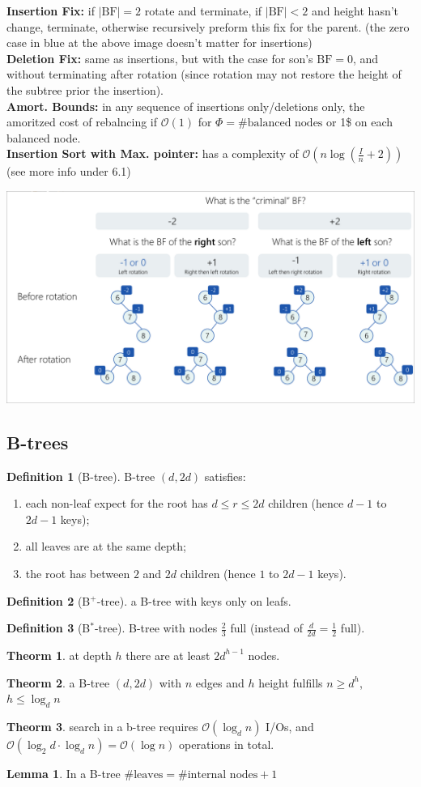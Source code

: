 \documentclass[]{article}
\newcommand\compactsubsection[1]        {\vspace{-10pt}\subsection{#1}\vspace{-6pt}}
\theoremstyle{definition}
\newtheorem{Theorem}{\color{theoColor}Theorm}
\newtheorem{Definition}{\color{defiColor}Definition}
\newtheorem{Lemma}{\color{lemColor}Lemma}
\newcommand\theo  [1] {\begin{Theorem}#1\end{Theorem}}
\newcommand\lem   [1] {\begin{Lemma}#1\end{Lemma}}
\newcommand\oc    {\mathcal{O}}
\newcommand\logn      {\log n}
\newcommand\sof[1]    {\left | #1 \right |}
\newcommand\cl [1]    {\left ( #1 \right )}
\begin{document}
\begin{multicols}{4}
				\textbf{Insertion Fix: }if $\sof{\mathrm{BF}} = 2$ rotate and terminate, if $|\mathrm{BF}| < 2$ and height hasn't change, terminate, otherwise recursively preform this fix for the parent. (the zero case in blue at the above image doesn't matter for insertions) \\
				\textbf{Deletion Fix: }same as insertions, but with the case for son's $\mathrm{BF}=0$, and without terminating after rotation (since rotation may not restore the height of the subtree prior the insertion). \\
				\textbf{Amort. Bounds: }in any sequence of insertions only/deletions only, the amoritzed cost of rebalncing if $\oc(1)$ for $\Phi = \# \text{balanced nodes}$ or 1\$ on each balanced node. \\
				\textbf{Insertion Sort with Max. pointer: }has a complexity of $\oc\cl{n \log\cl{\frac{I}{n} + 2}}$ (see more info under 6.1)
				\begin{center}
					\includegraphics[width=0.75\linewidth]{images/rotationTableDeletion}
				\end{center}
			
			\vspace{-5pt}
			\compactsubsection{B-trees}		
				\begin{Definition}[B-tree]
					B-tree $(d, 2d)$ satisfies: 
					\begin{enumerate}
						\item each non-leaf expect for the root has $d \le r \le 2d$ children (hence $d - 1$ to $2d - 1$ keys);
						\item all leaves are at the same depth;
						\item the root has between $2$ and $2d$ children (hence $1$ to $2d - 1$ keys). 
					\end{enumerate}
				\end{Definition}
				\begin{Definition}[B$^{\text{+}}$-tree]
					a B-tree with keys only on leafs. 
				\end{Definition}
				\begin{Definition}[B$^{\text{*}}$-tree]
					B-tree with nodes $\frac{2}{3}$ full (instead of $\frac{d}{2d} = \frac{1}{2}$ full). 
				\end{Definition}
				\theo{at depth $h$ there are at least $2d^{h - 1}$ nodes. }
				\theo{a B-tree $(d, 2d)$ with $n$ edges and $h$ height fulfills $n \ge d^{h}$, $h \le \log_{d} n$}
				\theo{search in a b-tree requires $\oc(\log_dn)$ I/Os, and $\oc(\log_2 d \cdot \log_d n) = \oc(\logn)$ operations in total. }
				\lem{In a B-tree $\# \text{leaves} = \# \text{internal nodes} + 1$}
				

\end{multicols}
\end{document}
